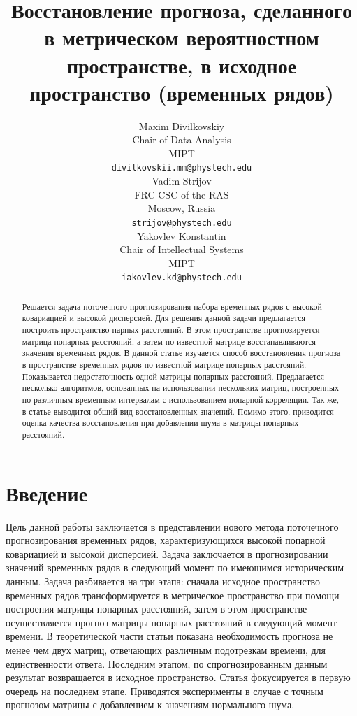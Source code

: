\documentclass{article}
\title{Восстановление прогноза, сделанного в метрическом вероятностном пространстве, в исходное пространство (временных рядов)}
\author{ Maxim Divilkovskiy \\
	Chair of Data Analysis\\
	MIPT\\
	\texttt{divilkovskii.mm@phystech.edu} \\
	\And
	Vadim Strijov \\
	FRC CSC of the RAS\\
	Moscow, Russia\\
    \texttt{strijov@phystech.edu} \\
    \And
    Yakovlev Konstantin \\
    Chair of Intellectual Systems\\
    MIPT\\
    \texttt{iakovlev.kd@phystech.edu} \\
}
\date{}
\begin{document}
\maketitle

\begin{abstract}
	Решается задача поточечного прогнозирования набора временных рядов с высокой ковариацией и высокой дисперсией. Для решения данной задачи предлагается построить пространство парных расстояний. В этом пространстве прогнозируется матрица попарных расстояний, а затем по известной матрице восстанавливаются значения временных рядов.
	В данной статье изучается способ восстановления прогноза в пространстве временных рядов по известной матрице попарных расстояний. Показывается недостаточность одной матрицы попарных расстояний. Предлагается несколько алгоритмов, основанных на использовании нескольких матриц, построенных по различным временным интервалам с использованием попарной корреляции. Так же, в статье выводится общий вид восстановленных значений. Помимо этого, приводится оценка качества восстановления при добавлении шума в матрицы попарных расстояний.


\end{abstract}



\section{Введение}
	Цель данной работы заключается в представлении нового метода поточечного прогнозирования временных рядов, характеризующихся высокой попарной ковариацией и высокой дисперсией. Задача заключается в прогнозировании значений временных рядов в следующий момент по имеющимся историческим данным. Задача разбивается на три этапа: сначала исходное пространство временных рядов трансформируется в метрическое пространство при помощи построения матрицы попарных расстояний, затем в этом пространстве осуществляется прогноз матрицы попарных расстояний в следующий момент времени. В теоретической части статьи показана необходимость прогноза не менее чем двух матриц, отвечающих различным подотрезкам времени, для единственности ответа. Последним этапом, по спрогнозированным данным результат возвращается в исходное пространство. Статья фокусируется в первую очередь на последнем этапе. Приводятся эксперименты в случае с точным прогнозом матрицы с добавлением к значениям нормального шума.
		
\end{document}
